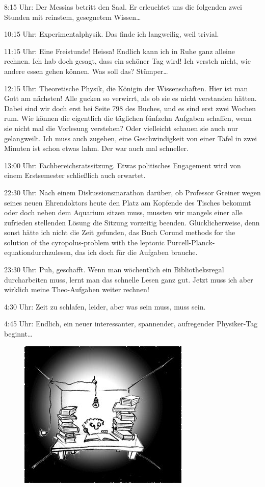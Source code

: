 8:15 Uhr: Der Messias betritt den Saal. Er erleuchtet uns die
folgenden zwei Stunden mit reinstem, gesegnetem Wissen\ldots

10:15 Uhr: Experimentalphysik. Das finde ich langweilig, weil
trivial.

11:15 Uhr: Eine Freistunde! Heissa! Endlich kann ich in Ruhe ganz alleine rechnen. Ich hab doch gesagt, dass ein schöner Tag wird! Ich versteh nicht, wie andere essen gehen können. Was soll das? Stümper\ldots

12:15 Uhr: Theoretische Physik, die Königin der Wissenschaften. Hier ist man Gott am nächsten! Alle gucken so verwirrt, als ob sie es nicht verstanden hätten. Dabei sind wir doch erst bei Seite 798 des Buches, und es sind erst zwei Wochen rum. Wie können die eigentlich die täglichen fünfzehn Aufgaben schaffen, wenn sie nicht mal die Vorlesung verstehen? Oder vielleicht schauen sie auch nur gelangweilt. Ich muss auch zugeben, eine Geschwindigkeit von einer Tafel in zwei Minuten ist schon etwas lahm. Der war auch mal schneller.

13:00 Uhr: Fachbereichsratssitzung. Etwas politisches Engagement wird von einem Erstsemester schließlich auch erwartet.

22:30 Uhr: Nach einem Diskussionsmarathon darüber, ob Professor Greiner wegen seines neuen Ehrendoktors heute den Platz am Kopfende des Tisches bekommt oder doch neben dem Aquarium sitzen muss, mussten wir mangels einer alle zufrieden stellenden Lösung die Sitzung vorzeitig beenden. Glücklicherweise, denn sonst hätte ich nicht die Zeit gefunden, das Buch \glqq Corund methods for the solution
of the cyropolus-problem with the leptonic Purcell-Planck-equation\grqq  durchzulesen, das ich doch für die Aufgaben brauche.

23:30 Uhr: Puh, geschafft. Wenn man wöchentlich ein Bibliotheksregal durcharbeiten muss, lernt man das schnelle Lesen ganz gut. Jetzt muss ich aber wirklich meine Theo-Aufgaben weiter rechnen! 

4:30 Uhr: Zeit zu schlafen, leider, aber was sein muss, muss sein.

4:45 Uhr: Endlich, ein neuer interessanter, spannender, aufregender Physiker-Tag beginnt\ldots
\begin{figure}[!b]
 \begin{center}
  \includegraphics[width=.8\textwidth]{bilder/ersti.jpg}
 \end{center}
\end{figure}

